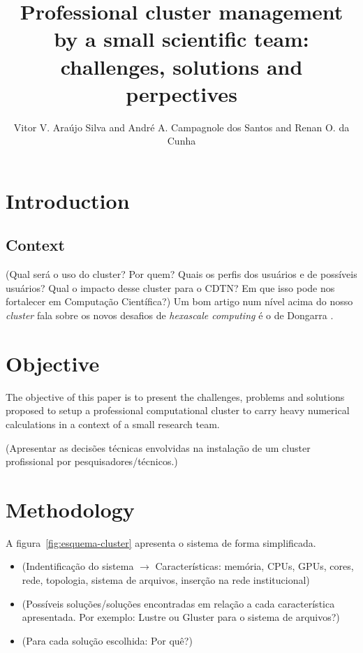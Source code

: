 \documentclass{anstrans}
\title{Professional cluster management by a small scientific team: challenges, solutions
and perpectives}
\author{Vitor V. Araújo Silva and André A. Campagnole dos Santos and Renan O. da Cunha}
\institute{
  Centro de Desenvolvimento da Tecnologia Nuclear - CDTN
}
\begin{document}
\vspace*{-42pt}
\begin{strip}
\vspace*{14pt}
\end{strip}


\section{Introduction}


\subsection{Context}
(Qual será o uso do cluster? Por quem? Quais os perfis dos usuários e de possíveis usuários?
Qual o impacto desse cluster para o CDTN? Em que isso pode nos fortalecer em Computação Científica?)
Um bom artigo num nível acima do nosso \textit{cluster} fala sobre os novos desafios de \textit{hexascale computing}
é o de Dongarra \cite{Dongarra2017}.

\section{Objective}

The objective of this paper is to present the challenges, problems and solutions proposed
to setup a professional computational
cluster to carry heavy numerical calculations in a context of a small research team.

(Apresentar as decisões técnicas envolvidas na instalação de um cluster
profissional por pesquisadores/técnicos.)

\section{Methodology}

  A figura~\ref{fig:esquema-cluster} apresenta o sistema de forma simplificada.
  
\begin{itemize}

\item (Indentificação do sistema $\rightarrow$ Características: memória, CPUs, GPUs, cores, rede, topologia, sistema de arquivos, inserção na rede institucional)

\item (Possíveis soluções/soluções encontradas em relação a cada característica apresentada. Por exemplo: Lustre \cite{Lustre} ou Gluster\cite{Gluster} para o sistema de arquivos?)

\item (Para cada solução escolhida: Por quê?)
  
\end{itemize}
\end{document}
